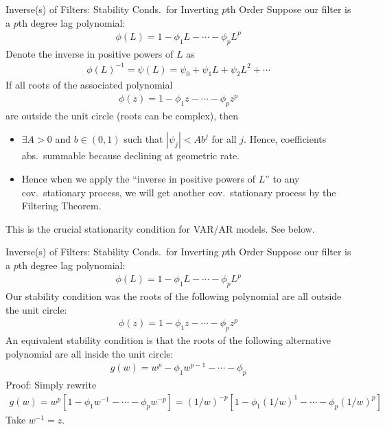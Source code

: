 \documentclass[aspectratio=169, handout]{beamer}
\begin{document}
{\scriptsize
\begin{frame}{Inverse(s) of Filters: Stability Conds.\ for Inverting $p$th Order}
Suppose our filter is a \alert{$p$th degree lag polynomial}:
\begin{align*}
  \phi(L)
  =
  1-\phi_1 L - \cdots - \phi_p L^p
\end{align*}
\pause
Denote the inverse in positive powers of $L$ as
\begin{align*}
  \phi(L)^{-1} = \psi(L) = \psi_0 + \psi_1 L + \psi_2 L^2 + \cdots
\end{align*}
\pause
If all \alert{roots} of the associated polynomial
\begin{align*}
  \phi(z)
  =
  1-\phi_1 z - \cdots - \phi_p z^p
\end{align*}
are \alert{outside the unit circle} (roots can be complex),
then
\begin{itemize}
  \item $\exists A>0$ and $b\in(0,1)$ such that $|\psi_j| < A b^j$ for
    all $j$.
    Hence, coefficients \alert{abs.\ summable} because declining at
    geometric rate.

  \pause
  \item Hence when we apply the ``inverse in positive powers
    of $L$'' to any cov.\ stationary process, we will get
    \alert{another cov.\ stationary process} by the Filtering
    Theorem.
\end{itemize}
\pause
This is the crucial stationarity condition for VAR/AR models.
See below.
\end{frame}
}


{\scriptsize
\begin{frame}{Inverse(s) of Filters: Stability Conds.\ for Inverting $p$th Order}
Suppose our filter is a \alert{$p$th degree lag polynomial}:
\begin{align*}
  \phi(L)
  =
  1-\phi_1 L - \cdots - \phi_p L^p
\end{align*}
Our stability condition was the roots of the following polynomial are
all \alert{outside the unit circle}:
\begin{align*}
  \phi(z)
  =
  1-\phi_1 z - \cdots - \phi_p z^p
\end{align*}
\pause
An equivalent stability condition is that the roots of the following
alternative polynomial are all \alert{inside the unit circle}:
\begin{align*}
  g(w)
  =
  w^p-\phi_1 w^{p-1} - \cdots - \phi_p
\end{align*}
\pause
Proof:
Simply rewrite
\begin{align*}
  g(w)
  =
  w^p[1-\phi_1 w^{-1} - \cdots - \phi_p w^{-p}]
  =
  (1/w)^{-p}[1-\phi_1 (1/w)^{1} - \cdots - \phi_p (1/w)^{p}]
\end{align*}
Take $w^{-1}=z$.
\end{frame}
}
\end{document}
